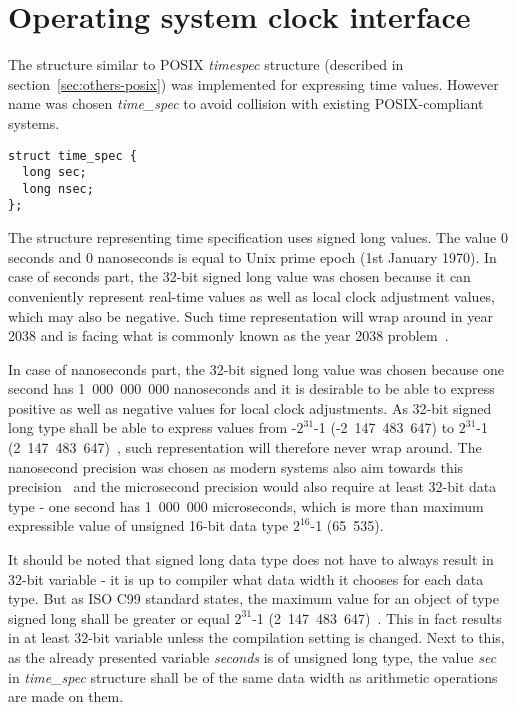 
\section{Operating system clock interface}

The structure similar to POSIX {\it{timespec}} structure (described in section~\ref{sec:others-posix})
was implemented for expressing time values.
However name was chosen {\it{time\_spec}} to avoid collision with existing POSIX-compliant systems.
\begin{lstlisting}
struct time_spec {
  long sec;
  long nsec;
};
\end{lstlisting}
The structure representing time specification uses signed long values.
The value 0 seconds and 0 nanoseconds is equal to Unix prime epoch (1st January 1970).
In case of seconds part, the 32-bit signed long value was chosen because
it can conveniently
represent real-time values as well as local clock adjustment values, which may also be negative.
Such time representation will wrap around in year 2038 and is facing
what is commonly known as the year 2038 problem~\cite{posix}.

In case of nanoseconds part, the 32-bit signed long value was chosen because
one second has 1~000~000~000 nanoseconds and it is
desirable to be able to express positive as well as negative values for local clock adjustments.
As 32-bit signed long type shall be able to express values from -$2^{31}$-1 (-2~147~483~647)
to $2^{31}$-1 (2~147~483~647)~\cite{c99},
such representation will therefore never wrap around.
The nanosecond precision was chosen as modern systems also aim towards this
precision~\cite{posix,ntp-precision} and
the microsecond precision would also require at least 32-bit data type -
one second has 1~000~000 microseconds, which is more than maximum expressible value of unsigned 16-bit
data type $2^{16}$-1 (65~535).

It should be noted that signed long data type does not have to always result in 32-bit variable -
it is up to compiler what data width it chooses for each data type.
But as ISO C99 standard states, the maximum value for an object of type signed long
shall be greater or equal $2^{31}$-1 (2~147~483~647)~\cite{c99}.
This in fact results in at least 32-bit variable unless the compilation setting is changed.
Next to this, as the already presented variable {\it{seconds}} is of unsigned long type,
the value {\it{sec}} in {\it{time\_spec}} structure %
shall be of the same data width as arithmetic operations are made on them.

